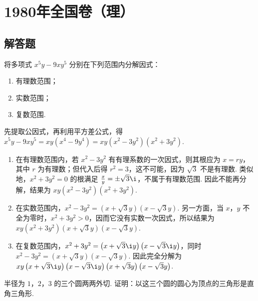 \documentclass[UTF8,a4paper,oneside,11pt]{ctexbook}
\begin{document}
\mainmatter

\chapter{1980年全国卷（理）}

\section{解答题}

\begin{problem}
将多项式 \(x^{5}y - 9xy^{5}\) 分别在下列范围内分解因式：

\begin{enumerate}
\item 有理数范围；
\item 实数范围；
\item 复数范围.
\end{enumerate}
\end{problem}

\begin{solution}
先提取公因式，再利用平方差公式，得
\(x^{5}y-9xy^{5}=xy\left(x^{4}-9y^{4}\right)=xy\left(x^{2}-3y^{2}\right)\left(x^{2}+3y^{2}\right)\).

\begin{enumerate}
\item 在有理数范围内，若 \(x^{2}-3y^{2}\) 有有理系数的一次因式，则其根应为 \(x=ry\)，其中 \(r\) 为有理数；但代入后得 \(r^{2}=3\)，这不可能，因为 \(\sqrt{3}\) 不是有理数. 类似地，\(x^{2}+3y^{2}=0\) 的根满足 \(\frac{x}{y}=\pm\sqrt{3}\i\)，不属于有理数范围. 因此不能再分解，结果为 \(xy\left(x^{2}-3y^{2}\right)\left(x^{2}+3y^{2}\right)\).
\item 在实数范围内，\(x^{2}-3y^{2}=\left(x+\sqrt{3}y\right)\left(x-\sqrt{3}y\right)\). 另一方面，当 \(x\)，\(y\) 不全为零时，\(x^{2}+3y^{2}>0\)，因而它没有实数一次因式，所以结果为 \(xy\left(x^{2}+3y^{2}\right)\left(x+\sqrt{3}y\right)\left(x-\sqrt{3}y\right)\).
\item 在复数范围内，\(x^{2}+3y^{2}=\left(x+\sqrt{3}\i y\right)\left(x-\sqrt{3}\i y\right)\)，同时 \(x^{2}-3y^{2}=\left(x+\sqrt{3}y\right)\left(x-\sqrt{3}y\right)\). 因此完全分解为 \(xy\left(x+\sqrt{3}\i y\right)\left(x-\sqrt{3}\i y\right)\left(x+\sqrt{3}y\right)\left(x-\sqrt{3}y\right)\).
\end{enumerate}
\end{solution}

\begin{problem}
半径为 \(1\)，\(2\)，\(3\) 的三个圆两两外切. 证明：以这三个圆的圆心为顶点的三角形是直角三角形.
\end{problem}
\end{document}
